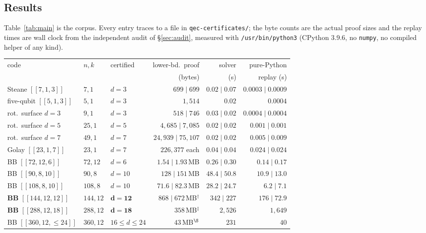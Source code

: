 \documentclass[11pt]{amsart}
\newcommand{\gross}{[[144,12,12]]}
\theoremstyle{plain}
\theoremstyle{definition}
\theoremstyle{remark}
\begin{document}
\subsection{Results}\label{ssec:results}
Table~\ref{tab:main} is the corpus. Every entry traces to a file in
\texttt{qec-certificates/}; the byte counts are the actual proof sizes and the
replay times are wall clock from the independent audit of
\S\ref{sec:audit}, measured with \texttt{/usr/bin/python3} (CPython 3.9.6, no
\texttt{numpy}, no compiled helper of any kind).

\begin{table}[t]
\small
\begin{tabular}{lllrrr}
\toprule
code & $n,k$ & certified & lower-bd.\ proof & solver & pure-Python \\
     &       &           & (bytes)          & (s)    & replay (s)  \\
\midrule
Steane $[[7,1,3]]$        & $7,1$   & $d=3$ & $699 \mid 699$ & $0.02\mid0.07$ & $0.0003\mid0.0009$\\
five-qubit $[[5,1,3]]$    & $5,1$   & $d=3$ & $1{,}514$ & $0.02$ & $0.0004$\\
rot.\ surface $d{=}3$     & $9,1$   & $d=3$ & $518 \mid 746$ & $0.03\mid0.02$ & $0.0004\mid0.0004$\\
rot.\ surface $d{=}5$     & $25,1$  & $d=5$ & $4{,}685 \mid 7{,}085$ & $0.02\mid0.02$ & $0.001\mid0.001$\\
rot.\ surface $d{=}7$     & $49,1$  & $d=7$ & $24{,}939 \mid 75{,}107$ & $0.02\mid0.02$ & $0.005\mid0.009$\\
Golay $[[23,1,7]]$        & $23,1$  & $d=7$ & $226{,}377$ each & $0.04\mid0.04$ & $0.024\mid0.024$\\
BB $[[72,12,6]]$          & $72,12$ & $d=6$ & $1.54\mid1.93$\,MB & $0.26\mid0.30$ & $0.14\mid0.17$\\
BB $[[90,8,10]]$          & $90,8$  & $d=10$ & $128\mid151$\,MB & $48.4\mid50.8$ & $10.9\mid13.0$\\
BB $[[108,8,10]]$         & $108,8$ & $d=10$ & $71.6\mid82.3$\,MB & $28.2\mid24.7$ & $6.2\mid7.1$\\
\textbf{BB} $\gross$      & $144,12$& $\mathbf{d=12}$ & $868\mid672$\,MB$^{\dagger}$ & $342\mid227$ & $176\mid72.9$\\
\textbf{BB} $[[288,12,18]]$ & $288,12$& $\mathbf{d=18}$ & $358$\,MB$^{\ddagger}$ & $2{,}526$ & $1{,}649$\\
BB $[[360,12,\le24]]$     & $360,12$& $16\le d\le 24$ & $43$\,MB$^{\S}$ & $231$ & $40$\\

\end{tabular}
\end{table}
\end{document}
